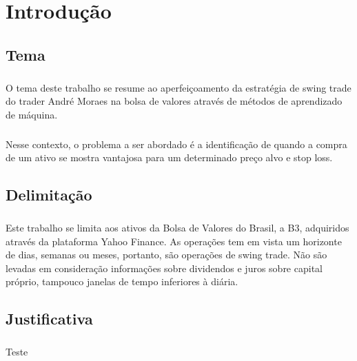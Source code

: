 \chapter{Introdução}
\label{cap1}

\section{Tema}

\paragraph{} O tema deste trabalho se resume ao aperfeiçoamento da estratégia de swing trade do trader André Moraes na bolsa de valores através de métodos de aprendizado de máquina.

\paragraph{} Nesse contexto, o problema a ser abordado é a identificação de quando a compra de um ativo se mostra vantajosa para um determinado preço alvo e stop loss.

\section{Delimitação}

\paragraph{} Este trabalho se limita aos ativos da Bolsa de Valores do Brasil, a B3, adquiridos através da plataforma Yahoo Finance. As operações tem em vista um horizonte de dias, semanas ou meses, portanto, são operações de swing trade. Não são levadas em consideração informações sobre dividendos e juros sobre capital próprio, tampouco janelas de tempo inferiores à diária.

\section{Justificativa}

\paragraph{} Teste \cite{aumento-investidores}
\paragraph{}



